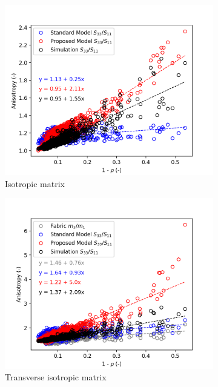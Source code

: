 \documentclass[a4paper,fleqn]{DC_ArtStyle}
\begin{document}
	\clearpage
	\begin{figure}
		\centering
		\begin{subfigure}[b]{0.45\linewidth}
			\includegraphics[width=\linewidth]{Anisotropy_SIsotropic}
			\caption{Isotropic matrix}
		\end{subfigure}
		\begin{subfigure}[b]{0.45\linewidth}
			\includegraphics[width=\linewidth]{Anisotropy_STransverse}
			\caption{Transverse isotropic matrix}
		\end{subfigure}
		\begin{subfigure}[b]{0.45\linewidth}

\end{subfigure}
\end{figure}
\end{document}
